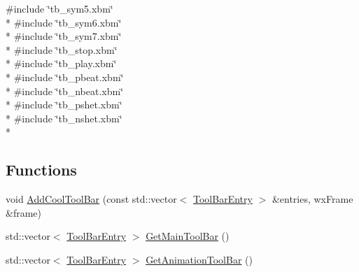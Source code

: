 {\ttfamily \#include \char`\"{}tb\-\_\-sym5.\-xbm\char`\"{}}\\*
{\ttfamily \#include \char`\"{}tb\-\_\-sym6.\-xbm\char`\"{}}\\*
{\ttfamily \#include \char`\"{}tb\-\_\-sym7.\-xbm\char`\"{}}\\*
{\ttfamily \#include \char`\"{}tb\-\_\-stop.\-xbm\char`\"{}}\\*
{\ttfamily \#include \char`\"{}tb\-\_\-play.\-xbm\char`\"{}}\\*
{\ttfamily \#include \char`\"{}tb\-\_\-pbeat.\-xbm\char`\"{}}\\*
{\ttfamily \#include \char`\"{}tb\-\_\-nbeat.\-xbm\char`\"{}}\\*
{\ttfamily \#include \char`\"{}tb\-\_\-pshet.\-xbm\char`\"{}}\\*
{\ttfamily \#include \char`\"{}tb\-\_\-nshet.\-xbm\char`\"{}}\\*
\subsection*{Functions}
\begin{DoxyCompactItemize}
\item 
void \hyperlink{a00246_aa7c5ee2c49b381579f495b0194177f13}{Add\-Cool\-Tool\-Bar} (const std\-::vector$<$ \hyperlink{a00145}{Tool\-Bar\-Entry} $>$ \&entries, wx\-Frame \&frame)
\item 
std\-::vector$<$ \hyperlink{a00145}{Tool\-Bar\-Entry} $>$ \hyperlink{a00246_ac022268365dbe9564565f03416136e37}{Get\-Main\-Tool\-Bar} ()
\item 
std\-::vector$<$ \hyperlink{a00145}{Tool\-Bar\-Entry} $>$ \hyperlink{a00246_a0405689ffdc482e4b9b5383c789ff9bc}{Get\-Animation\-Tool\-Bar} ()
\end{DoxyCompactItemize}


